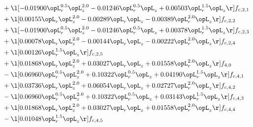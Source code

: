\begin{alignat}{2}
& + \l[  -0.01900 \opL_r^{0.5} \opL_z^{2.0}   -0.01246 \opL_r^{0.5} \opL_z +  0.00503 \opL_r^{1.5} \opL_z  \r] f_{c,2,1} \nonumber \\ 
& + \l[  0.00155 \opL_r \opL_z^{2.0}   -0.00289 \opL_r \opL_z   -0.00389 \opL_r^{2.0} \opL_z  \r] f_{c,2,2} \nonumber \\ 
& + \l[  -0.01900 \opL_r^{0.5} \opL_z^{2.0}   -0.01246 \opL_r^{0.5} \opL_z +  0.00378 \opL_r^{1.5} \opL_z  \r] f_{c,2,3} \nonumber \\ 
& + \l[  0.00078 \opL_r \opL_z^{2.0}   -0.00144 \opL_r \opL_z   -0.00222 \opL_r^{2.0} \opL_z  \r] f_{c,2,4} \nonumber \\ 
& + \l[  0.00126 \opL_r^{1.5} \opL_z  \r] f_{c,2,5} \nonumber \\ 
& + \l[  0.01868 \opL_r \opL_z^{2.0} +  0.03027 \opL_r \opL_z +  0.01558 \opL_r^{2.0} \opL_z  \r] f_{4,0} \nonumber \\ 
& - \l[  0.06960 \opL_r^{0.5} \opL_z^{2.0} +  0.10322 \opL_r^{0.5} \opL_z +  0.04190 \opL_r^{1.5} \opL_z  \r] f_{c,4,1} \nonumber \\ 
& + \l[  0.03736 \opL_r \opL_z^{2.0} +  0.06054 \opL_r \opL_z +  0.02727 \opL_r^{2.0} \opL_z  \r] f_{c,4,2} \nonumber \\ 
& - \l[  0.06960 \opL_r^{0.5} \opL_z^{2.0} +  0.10322 \opL_r^{0.5} \opL_z +  0.03143 \opL_r^{1.5} \opL_z  \r] f_{c,4,3} \nonumber \\ 
& + \l[  0.01868 \opL_r \opL_z^{2.0} +  0.03027 \opL_r \opL_z +  0.01558 \opL_r^{2.0} \opL_z  \r] f_{c,4,4} \nonumber \\ 
& - \l[  0.01048 \opL_r^{1.5} \opL_z  \r] f_{c,4,5} \nonumber \\ 
\end{alignat} 


